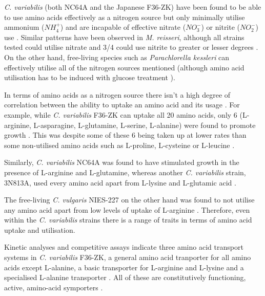 \textit{C. variabilis} (both NC64A and the Japanese F36-ZK) have been 
found to be able to use amino acids effectively as a nitrogen source but
only minimally utilise ammonium (\(NH_4^{+}\)) and are incapable of effective
nitrate (\(NO_3^{-}\)) or nitrite (\(NO_2^{-}\)) use \citep{Kamako2005,Kato2009a}.
Similar patterns have been observed in \textit{M. reisseri}, although
all strains tested could utilise nitrate and 3/4 could use nitrite
to greater or lesser degrees \citep{Kessler1990}.
On the other hand, free-living species such as \textit{Parachlorella
kessleri} can effectively utilise all of the nitrogen sources mentioned \citep{Kato2009a} 
(although amino acid utilisation has to be induced with glucose treatment 
\citep{Cho1981}).


In terms of amino acids as a nitrogen source there isn't
a high degree of correlation between the ability to uptake an amino acid
and its usage \citep{Kato2009a}.
For example, while \textit{C. variabilis} F36-ZK can
uptake all 20 amino acids, only 6 (L-arginine, L-asparagine,
L-glutamine, L-serine, L-alanine) were found to promote growth \citep{Kato2006}.
This was despite some of these 6 being taken up at lower rates
than some non-utilised amino acids such as L-proline, L-cysteine or L-leucine \citep{Kato2006}.

Similarly, \textit{C. variabilis} NC64A was found to have stimulated growth
in the presence of L-arginine and L-glutamine, whereas another \textit{C. variabilis}
strain, 3N813A, used every amino acid apart from L-lysine and L-glutamic acid \citep{McAuley1986,Kato2009a}.

%
The free-living \textit{C. vulgaris} NIES-227 on the other hand was found to not utilise
any amino acid apart from low levels of uptake of L-arginine \citep{Kato2006}.
Therefore, even within the \textit{C. variabilis} strains there is a range 
of traits in terms of amino acid uptake and utilisation.


Kinetic analyses and competitive assays indicate three amino acid transport
systems in \textit{C. variabilis} F36-ZK, a general amino acid tranporter
for all amino acids except L-alanine, a basic transporter for L-arginine and L-lysine
and a specialised L-alanine transporter \citep{Kato2009b,Kato2009a}.
All of these are constitutively functioning, active, amino-acid symporters \citep{Kato2009b,Kato2009a}.

